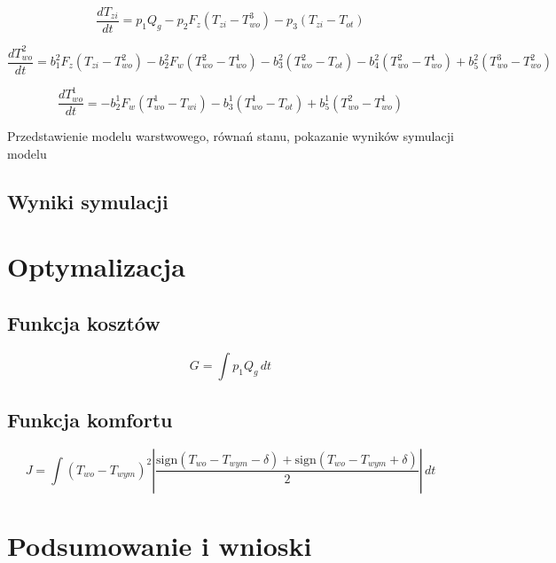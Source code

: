 \documentclass[a4paper,twoside,12pt]{book}
\begin{document}
\begin{equation}
	\frac{dT_{zi}}{dt} = p_1 Q_g - p_2 F_z (T_{zi} - T_{wo}^{3}) - p_3 (T_{zi} - T_{ot})
\end{equation}

\begin{equation}
	\frac{dT_{wo}^{2}}{dt} = b_1^2 F_z (T_{zi} - T_{wo}^{2}) - b_2^2 F_w (T_{wo}^{2} - T_{wo}^{1}) - b_3^2 (T_{wo}^{2} - T_{ot}) - b_4^2 (T_{wo}^{2} - T_{wo}^{1}) + b_5^2 (T_{wo}^{3} - T_{wo}^{2})
\end{equation}

\begin{equation}
	\frac{dT_{wo}^{1}}{dt} = -b_2^1 F_w (T_{wo}^{1} - T_{wi}) - b_3^1 (T_{wo}^{1} - T_{ot}) + b_5^1 (T_{wo}^{2} - T_{wo}^{1})
\end{equation}

Przedstawienie modelu warstwowego, równań stanu, pokazanie wyników symulacji modelu
\section{Wyniki symulacji}


\chapter{Optymalizacja}
\label{ch:06}
\section{Funkcja kosztów}
\begin{equation}
	G = \int p_1 Q_g \, dt
\end{equation}
\section{Funkcja komfortu}
\begin{equation}
	J = \int \left( T_{wo} - T_{wym} \right)^2 \left| \frac{\text{sign}(T_{wo} - T_{wym} - \delta) + \text{sign}(T_{wo} - T_{wym} + \delta)}{2} \right| \, dt
\end{equation}




\chapter{Podsumowanie i wnioski}
\end{document}
